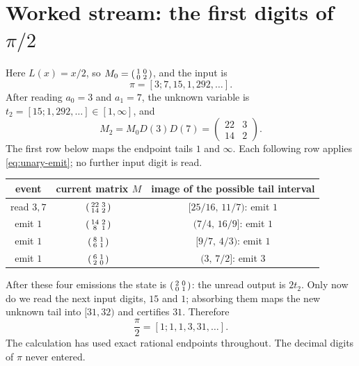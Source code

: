\section{Worked stream: the first digits of \texorpdfstring{$\pi/2$}{pi/2}}

Here $L(x)=x/2$, so
$M_0=\begin{psmallmatrix}1&0\\0&2\end{psmallmatrix}$, and the input is
\[
 \pi=[3;7,15,1,292,\dots].
\]
After reading $a_0=3$ and $a_1=7$, the unknown variable is
$t_2=[15;1,292,\dots]\in[1,\infty]$, and
\[
 M_2=M_0D(3)D(7)=\begin{pmatrix}22&3\\14&2\end{pmatrix}.
\]
The first row below maps the endpoint tails $1$ and $\infty$.  Each following
row applies \eqref{eq:unary-emit}; no further input digit is read.

\begin{center}
\small
\begin{tabular}{c c c}
\toprule
event & current matrix $M$ & image of the possible tail interval \\
\midrule
read $3,7$ & $\begin{psmallmatrix}22&3\\14&2\end{psmallmatrix}$
 & $[25/16,\,11/7)$: emit $1$ \\
emit $1$ & $\begin{psmallmatrix}14&2\\8&1\end{psmallmatrix}$
 & $(7/4,\,16/9]$: emit $1$ \\
emit $1$ & $\begin{psmallmatrix}8&1\\6&1\end{psmallmatrix}$
 & $[9/7,\,4/3)$: emit $1$ \\
emit $1$ & $\begin{psmallmatrix}6&1\\2&0\end{psmallmatrix}$
 & $(3,\,7/2]$: emit $3$ \\
\bottomrule
\end{tabular}
\end{center}

After these four emissions the state is
$\begin{psmallmatrix}2&0\\0&1\end{psmallmatrix}$: the unread output is
$2t_2$.  Only now do we read the next input digits, $15$ and $1$; absorbing
them maps the new unknown tail into $[31,32)$ and certifies $31$.  Therefore
\[
 \frac\pi2=[1;1,1,3,31,\dots].
\]
The calculation has used exact rational endpoints throughout.  The decimal
digits of $\pi$ never entered.

